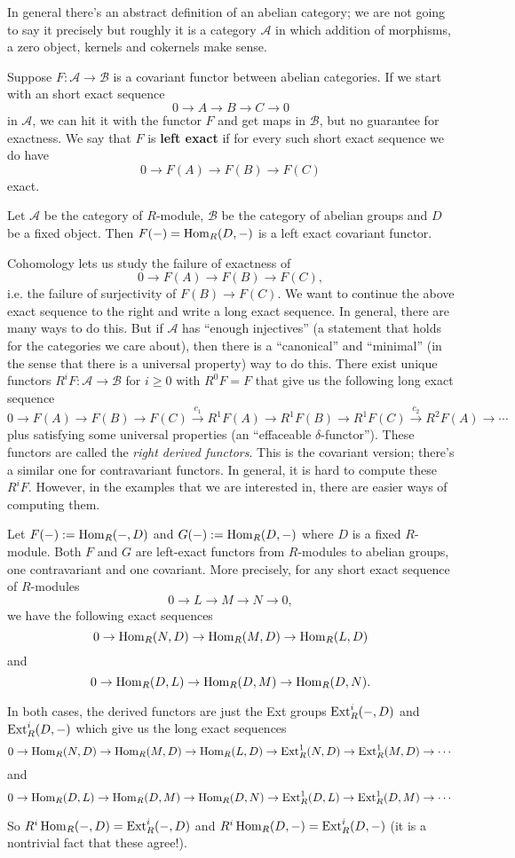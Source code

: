 In general there's an abstract definition of an abelian category; we are not going to say it precisely but roughly it is a category $\mathcal{A}$ in which addition of morphisms, a zero object, kernels and cokernels make sense.

Suppose $F:\mathcal{A}\to \mathcal{B}$ is a covariant functor between abelian categories. If we start with an short exact sequence 
$$0\to A \to B \to C \to 0$$
in $\mathcal{A}$, we can hit it with the functor $F$ and get maps in $\mathcal{B}$, but no guarantee for exactness. We say that $F$ is \textbf{left exact} if for every such short exact sequence we do have
$$0\to F(A)\to F(B)\to F(C)$$ 
exact. 

\begin{example}
Let $\mathcal{A}$ be the category of $R$-module, $\mathcal{B}$ be the category of abelian groups and $D$ be a fixed object. Then $F(-)=\operatorname{Hom}_R(D,-)$ is a left exact covariant functor.
\end{example}

Cohomology lets us study the failure of exactness of 
$$0\to F(A)\to F(B)\to F(C),$$
i.e. the failure of surjectivity of $F(B)\to F(C)$. We want to continue the above exact sequence to the right and write a long exact sequence. In general, there are many ways to do this. But if $\mathcal{A}$ has ``enough injectives'' (a statement that holds for the categories we care about), then there is a ``canonical'' and ``minimal'' (in the sense that there is a universal property) way to do this. There exist unique functors $R^iF:\mathcal{A}\to \mathcal{B}$ for $i\geq 0$ with $R^0F=F$ that give us the following long exact sequence
$$0\to F(A)\to F(B) \to F(C) \overset{c_1}{\to} R^1F(A)\to R^1F(B) \to R^1F(C)\overset{c_2}{\to} R^2F(A) \to \cdots$$
plus satisfying some universal properties (an ``effaceable $\delta$-functor''). These functors are called the \emph{right derived functors}. This is the covariant version; there's a similar one for contravariant functors. In general, it is hard to compute these $R^iF$. However, in the examples that we are interested in, there are easier ways of computing them.

\begin{example}
Let $F(-):=\operatorname{Hom}_R(-,D)$ and $G(-):=\operatorname{Hom}_R(D,-)$ where $D$ is a fixed $R$-module. Both $F$ and $G$ are left-exact functors from $R$-modules to abelian groups, one contravariant and one covariant. More precisely, for any short exact sequence of $R$-modules
$$0\to L \to M \to N \to 0,$$
we have the following exact sequences
$$0\to \operatorname{Hom}_R(N,D)\to \operatorname{Hom}_R(M,D)\to \operatorname{Hom}_R(L,D)$$
and 
$$0\to \operatorname{Hom}_R(D,L)\to \operatorname{Hom}_R(D,M)\to \operatorname{Hom}_R(D,N).$$

In both cases, the derived functors are just the Ext groups $\operatorname{Ext}_R^i(-,D)$ and $\operatorname{Ext}_R^i(D,-)$
which give us the long exact sequences
$$0\to \operatorname{Hom}_R(N,D)\to \operatorname{Hom}_R(M,D)\to \operatorname{Hom}_R(L,D)\to \operatorname{Ext}_R^1(N,D)\to \operatorname{Ext}_R^1(M,D)\to \cdots$$
and 
$$0\to \operatorname{Hom}_R(D,L)\to \operatorname{Hom}_R(D,M)\to \operatorname{Hom}_R(D,N)\to \operatorname{Ext}_R^1(D,L)\to \operatorname{Ext}_R^1(D,M)\to \cdots$$

So $R^i\operatorname{Hom}_R(-,D)=\operatorname{Ext}_R^i(-,D)$ and $R^i\operatorname{Hom}_R(D,-)=\operatorname{Ext}_R^i(D,-)$ (it is a nontrivial fact that these agree!). 
\end{example}

